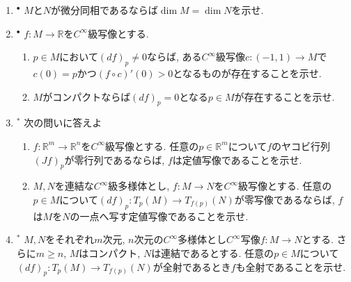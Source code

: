 \documentclass[dvipdfmx,a4paper,11pt]{article}
\newcommand{\R}{\mathbb{R}}
\theoremstyle{definition}
\begin{document}
\begin{enumerate}[label=\textbf{問}\ref*{sec-manifold}.\arabic*]
\item $^\bullet$ $M$と$N$が微分同相であるならば$\dim M =\dim N$を示せ. 


\item $^\bullet$ $f : M\rightarrow \R$を$C^{\infty}$級写像とする.
\begin{enumerate}
\item $p \in M$において$(df)_{p} \neq 0$ならば, ある$C^{\infty}$級写像$c : (-1,1) \rightarrow M$で$c(0)=p$かつ$(f \circ c)'(0) >0$となるものが存在することを示せ. 
\item $M$がコンパクトならば$(df)_{p} = 0$となる$p \in M$が存在することを示せ. 
\end{enumerate}


\item$^*$ 次の問いに答えよ
\begin{enumerate}
     \setlength{\parskip}{0cm}
  \setlength{\itemsep}{0pt} 
\item $f : \R^m \to \R^n$を$C^\infty$級写像とする. 任意の$p \in \R^m$について$f$のヤコビ行列$(Jf)_{p} $が零行列であるならば, $f$は定値写像であることを示せ. 
\item $M,N$を連結な$C^\infty$級多様体とし, $f : M \rightarrow N$を$C^\infty$級写像とする. 任意の$p \in M$について$(df)_{p} : T_{p}(M) \rightarrow T_{f(p)}(N)$が零写像であるならば, $f$は$M$を$N$の一点へ写す定値写像であることを示せ. 
\end{enumerate}

\item$^*$ %
$M,N$をそれぞれ$m$次元, $n$次元の$C^{\infty}$多様体とし$C^{\infty}$写像$f : M \rightarrow N$とする. さらに$m \ge n$, $M$はコンパクト, $N$は連結であるとする. 
任意の$p \in M$について$(df)_{p} : T_{p}(M) \rightarrow T_{f(p)}(N)$が全射であるとき$f$も全射であることを示せ. 



\end{enumerate}
\end{document}
